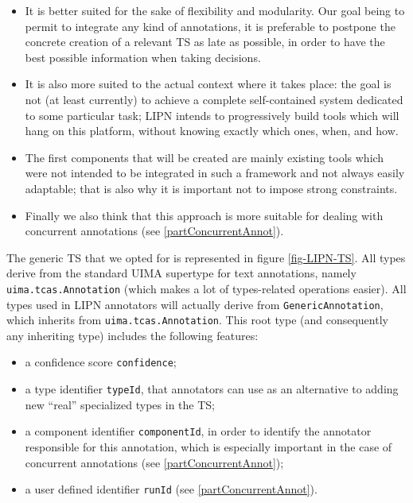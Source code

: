 \documentclass{article}
\newenvironment{xitemize}{
\begin{itemize}
  \setlength{\itemsep}{.3\baselineskip}
  \setlength{\topsep}{0pt}
  \setlength{\parskip}{0pt}
  \setlength{\parsep}{0pt}
}{\end{itemize}}
\begin{document}
\begin{itemize}
\item It is better suited for the sake of flexibility and modularity. Our goal being to permit to integrate any kind of annotations, it is preferable to postpone the concrete creation of a relevant TS as late as possible, in order to have the best possible information when taking decisions.
\item It is also more suited to the actual context where it takes place: the goal is not (at least currently) to achieve a complete self-contained system dedicated to some particular task; LIPN intends to progressively build tools which will hang on this platform, without knowing exactly which ones, when, and how. 
\item The first components that will be created are mainly existing tools which were not intended to be integrated in such a framework and not always easily adaptable; that is also why it is important not to impose strong constraints. 
\item Finally we  also think that  this approach is more suitable for dealing with concurrent annotations (see \ref{partConcurrentAnnot}).
\end{itemize}



The generic TS that we opted for is represented in figure \ref{fig-LIPN-TS}. All types derive from the standard UIMA supertype for text annotations, namely {\tt uima.tcas.Annotation} (which makes a lot of types-related operations easier). All types used in LIPN annotators will actually derive from {\tt GenericAnnotation}, which inherits from {\tt uima.tcas.Annotation}. This root type (and consequently any inheriting type) includes the following features:
\begin{xitemize}
\item a confidence score {\tt confidence};
\item a type identifier {\tt typeId}, that annotators can use as an alternative to adding new ``real'' specialized types in the TS; 
\item  a component identifier {\tt componentId}, in order to identify the annotator responsible for this annotation, which is especially important in the case of concurrent annotations (see \ref{partConcurrentAnnot});
\item a user defined identifier {\tt runId} (see \ref{partConcurrentAnnot}).
\end{xitemize}
\end{document}
